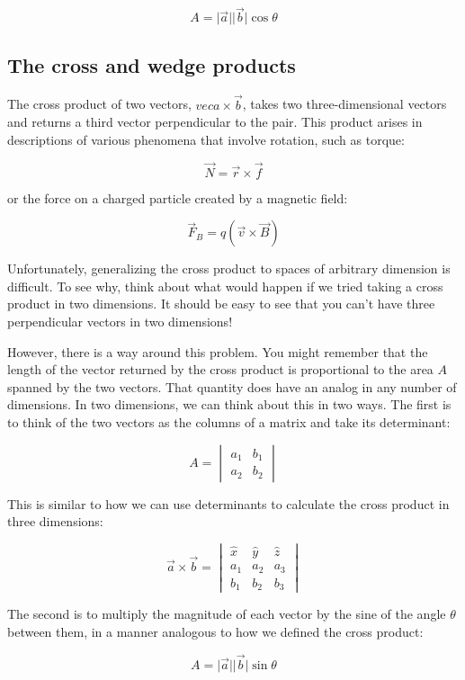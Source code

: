 $$A = \lvert\vec{a}\rvert \lvert\vec{b}\rvert \cos \theta$$

\subsection{The cross and wedge products}

The cross product of two vectors, $vec{a}\times\vec{b}$, takes two three-dimensional vectors and
returns a third vector perpendicular to the pair. This product arises in descriptions of various
phenomena that involve rotation, such as torque:

$$\vec{N} = \vec{r} \times \vec{f}$$

or the force on a charged particle created by a magnetic field:

$$\vec{F}_{B} = q\left( \vec{v} \times \vec{B} \right)$$

Unfortunately, generalizing the cross product to spaces of arbitrary dimension is difficult. To see
why, think about what would happen if we tried taking a cross product in two dimensions. It should
be easy to see that you can't have three perpendicular vectors in two dimensions!

However, there is a way around this problem. You might remember that the length of the vector
returned by the cross product is proportional to the area $A$ spanned by the two vectors. That
quantity does have an analog in any number of dimensions. In two dimensions, we can think about
this in two ways. The first is to think of the two vectors as the columns of a matrix and take its
determinant:

$$A = \begin{vmatrix}
a_{1} & b_{1} \\
a_{2} & b_{2}
\end{vmatrix}$$

This is similar to how we can use determinants to calculate the cross product in three dimensions:

$$\vec{a}\times\vec{b} = \begin{vmatrix}
    \hat{x} & \hat{y} & \hat{z} \\
    a_{1} & a_{2} & a_{3} \\
    b_{1} & b_{2} & b_{3}
\end{vmatrix}$$

The second is to multiply the magnitude of each vector by the sine of the angle $\theta$ between 
them, in a manner analogous to how we defined the cross product:

$$A = \lvert\vec{a}\rvert \lvert\vec{b}\rvert \sin \theta$$

